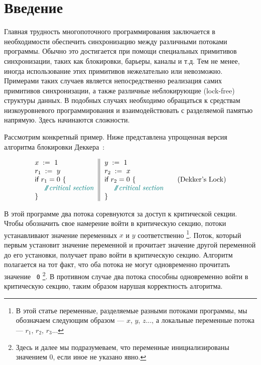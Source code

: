 \section{Введение}
\label{sec:intro}

Главная трудность многопоточного программирования 
заключается в необходимости обеспечить  
синхронизацию между различными потоками программы. 
Обычно это достигается при помощи специальных 
примитивов синхронизации, 
таких как блокировки, барьеры, каналы и т.д. 
Тем не менее, иногда использование этих примитивов 
нежелательно или невозможно. 
Примерами таких случаев является 
непосредственно реализация самих примитивов синхронизации,
а также различные неблокирующие (lock-free) структуры данных.
В подобных случаях необходимо обращаться к средствам
низкоуровневого программирования и 
взаимодействовать с разделяемой памятью напрямую.
Здесь начинаются сложности. 

Рассмотрим конкретный пример.
Ниже представлена упрощенная версия 
алгоритма блокировки Деккера~\cite{Dijkstra:68}:

\begin{equation*}
\inarrII{
  \writeInst{}{x}{1} \\
  \readInst{}{r_1}{y}  \\
  \kw{if} {r_1 = 0} ~\{ \\
  ~~ \comment{critical section} \\
  \}
}{
  \writeInst{}{y}{1} \\
  \readInst{}{r_2}{x}  \\
  \kw{if} {r_2 = 0} ~\{ \\
  ~~ \comment{critical section} \\
  \}
}
\tag{Dekker's Lock}\label{ex:Dekker}
\end{equation*}

В этой программе два потока соревнуются за доступ к критической секции.
Чтобы обозначить свое намерение войти в критическую секцию,
потоки устанавливают значение переменных $x$ и $y$ соответственно%
\footnote{В этой статье  переменные,  разделяемые разными потоками программы, мы обозначаем следующим образом ---
 $x$, $y$, $z$..., а локальные переменные  потока --- $r_1$, $r_2$, $r_3$...}.
Поток, который первым установит значение переменной и 
прочитает значение другой переменной до его установки,
получает право войти в критическую секцию.
Алгоритм полагается на тот факт, что оба 
потока не могут одновременно прочитать значение ~\texttt{0}%
\footnote{Здесь и далее  мы подразумеваем, 
что переменные инициализированы значением 0, если иное не указано явно.}.
В противном случае два потока способны одновременно 
войти в критическую секцию, таким образом нарушая корректность алгоритма. 

